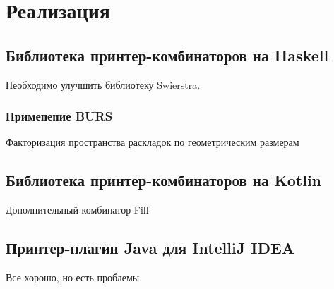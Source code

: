 \section{Реализация}

\subsection{Библиотека принтер-комбинаторов на Haskell}
Необходимо улучшить библиотеку Swierstra. 

\subsubsection{Применение BURS}
Факторизация пространства раскладок по геометрическим размерам

\subsection{Библиотека принтер-комбинаторов на Kotlin}
Дополнительный комбинатор Fill

\subsection{Принтер-плагин Java для IntelliJ IDEA}

Все хорошо, но есть проблемы.

